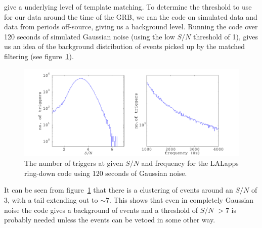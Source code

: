 give a underlying level of template matching. To determine the threshold to use for our data around
the time of the GRB, we ran the code on simulated data and data from periods off-source, giving
us a background level. Running the code over 120 seconds of simulated Gaussian noise (using the low
$S/N$ threshold of 1), gives us an idea of the background distribution of events picked up by the
matched filtering (see figure~\ref{RingSimDataHist}).
\begin{figure}[!htbp]
\begin{center}
\includegraphics[width=1.0\textwidth]{figs/RingSimDataHist}\caption{The number of triggers at given
$S/N$ and frequency for the LALapps ring-down code using 120 seconds of Gaussian
noise.}\label{RingSimDataHist}
\end{center}
\end{figure}
It can be seen from figure~\ref{RingSimDataHist} that there is a clustering of events around an
$S/N$ of 3, with a tail extending out to $\sim 7$. This shows that even in completely Gaussian noise
the code gives a background of events and a threshold of $S/N$ $> 7$ is probably needed unless the
events can be vetoed in some other way.

